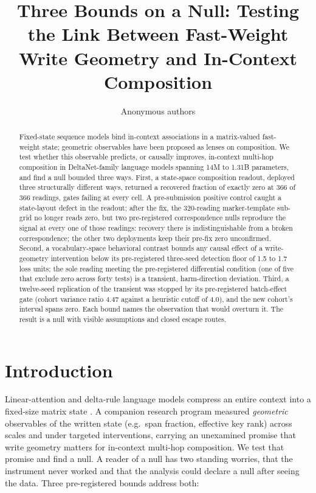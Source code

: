 \documentclass{article} %
\title{Three Bounds on a Null: Testing the Link Between Fast-Weight Write
Geometry and In-Context Composition}
\author{Anonymous authors}
\begin{document}
\ifcolmsubmission
\linenumbers
\fi

\maketitle

\begin{abstract}
Fixed-state sequence models bind in-context associations in a matrix-valued
fast-weight state; geometric observables have been proposed as lenses on
composition. We test whether this observable predicts, or causally
improves, in-context multi-hop composition in DeltaNet-family language
models spanning 14M to 1.31B parameters, and find a null bounded three
ways. First, a state-space composition readout, deployed three
structurally different ways, returned a recovered fraction of exactly zero
at 366 of 366 readings, %
gates failing at every cell. %
A pre-submission positive control caught a state-layout defect in the
readout; %
after the fix, the 320-reading marker-template sub-grid no longer reads
zero, %
but two pre-registered correspondence nulls reproduce the signal at every
one of those readings: recovery there is indistinguishable from a broken
correspondence; the other two deployments keep their pre-fix zero
unconfirmed. %
Second, a
vocabulary-space behavioral contrast bounds any causal effect of a
write-geometry intervention below its pre-registered three-seed detection
floor of 1.5 to 1.7 loss units; %
the sole reading meeting the pre-registered differential condition (one of
five that exclude zero across forty tests) is a transient, harm-direction
deviation. Third, a twelve-seed replication of the transient was
stopped by its pre-registered batch-effect gate (cohort variance ratio
4.47 against a heuristic cutoff of 4.0), %
and the new cohort's interval spans zero. Each bound names the observation
that would overturn it. The result is a null with visible assumptions and
closed escape routes.
\end{abstract}

\section{Introduction}

Linear-attention and delta-rule language models compress an entire context
into a fixed-size matrix state
\citep{schlag2021linear,yang2024parallelizing}. A companion research program
measured \emph{geometric} observables of the written state (e.g.\ span
fraction, effective key rank) across scales and under targeted
interventions, carrying an unexamined promise that write geometry matters
for in-context multi-hop composition. We test that promise and find a
null. A reader of a null has two standing worries, that the instrument
never worked and that the analysis could declare a null after seeing the
data. Three pre-registered bounds address both:
\end{document}
